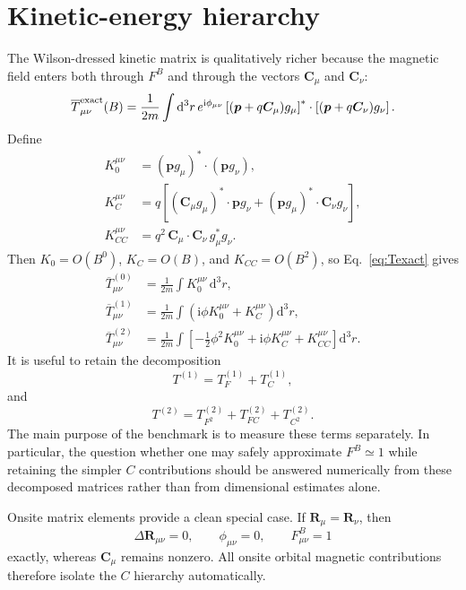 \documentclass[11pt]{article}
\newcommand{\ii}{\mathrm{i}}
\newcommand{\dd}{\mathrm{d}}
\newcommand{\vect}[1]{\bm{#1}}
\begin{document}
\section{Kinetic-energy hierarchy}

The Wilson-dressed kinetic matrix is qualitatively richer because the magnetic field enters both through $F^B$ and through the vectors $\vect C_\mu$ and $\vect C_\nu$:
\begin{equation}
\overline T_{\mu\nu}^{\rm exact}(B)
=\frac{1}{2m}\int \dd^3r\,
 e^{\ii\phi_{\mu\nu}}
 \left[(\vect p+q\vect C_\mu)g_\mu\right]^*
 \cdot
 \left[(\vect p+q\vect C_\nu)g_\nu\right].
\label{eq:Texact}
\end{equation}
Define
\begin{align}
K_0^{\mu\nu}
&=(\vect p g_\mu)^*\cdot(\vect p g_\nu),\\
K_C^{\mu\nu}
&=q\left[
(\vect C_\mu g_\mu)^*\cdot\vect p g_\nu
+(\vect p g_\mu)^*\cdot\vect C_\nu g_\nu
\right],\\
K_{CC}^{\mu\nu}
&=q^2\,\vect C_\mu\cdot\vect C_\nu\,
 g_\mu^*g_\nu.
\end{align}
Then $K_0=O(B^0)$, $K_C=O(B)$, and $K_{CC}=O(B^2)$, so Eq.~\eqref{eq:Texact} gives
\begin{align}
\overline T^{(0)}_{\mu\nu}
&=\frac{1}{2m}\int K_0^{\mu\nu}\,\dd^3r,
\label{eq:T0}\\
\overline T^{(1)}_{\mu\nu}
&=\frac{1}{2m}\int
\left(\ii\phi K_0^{\mu\nu}+K_C^{\mu\nu}\right)\dd^3r,
\label{eq:T1}\\
\overline T^{(2)}_{\mu\nu}
&=\frac{1}{2m}\int
\left[-\frac12\phi^2K_0^{\mu\nu}
+\ii\phi K_C^{\mu\nu}
+K_{CC}^{\mu\nu}\right]\dd^3r.
\label{eq:T2}
\end{align}
It is useful to retain the decomposition
\begin{equation}
\boxed{
T^{(1)}=T_F^{(1)}+T_C^{(1)},
}
\end{equation}
and
\begin{equation}
\boxed{
T^{(2)}=T_{F^2}^{(2)}+T_{FC}^{(2)}+T_{C^2}^{(2)}.
}
\end{equation}
The main purpose of the benchmark is to measure these terms separately.  In particular, the question whether one may safely approximate $F^B\simeq1$ while retaining the simpler $C$ contributions should be answered numerically from these decomposed matrices rather than from dimensional estimates alone.

Onsite matrix elements provide a clean special case.  If $\vect R_\mu=\vect R_\nu$, then
\begin{equation}
\Delta\vect R_{\mu\nu}=0,
\qquad
\phi_{\mu\nu}=0,
\qquad
F^B_{\mu\nu}=1
\end{equation}
exactly, whereas $\vect C_\mu$ remains nonzero.  All onsite orbital magnetic contributions therefore isolate the $C$ hierarchy automatically.
\end{document}
